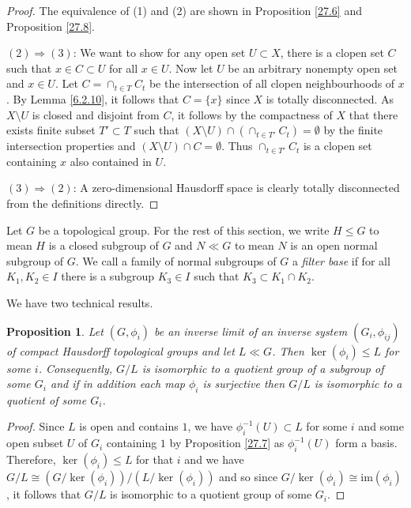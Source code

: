 \documentclass[12pt]{report}
\newtheorem{proposition}[theorem]{Proposition}
{\theoremstyle{remark}\newtheorem*{remark}{Remark}}
\theoremstyle{definition}
\newcommand{\im}{\text{im}}
\begin{document}
\begin{proof}
	The equivalence of (1) and (2) are shown in Proposition \ref{27.6}  and Proposition \ref{27.8}.

	$(2)\Longrightarrow (3)$: We want to show for any open set $U\subset X$, there is a clopen set $C$ such that $x\in C\subset U$ for all $x\in U$. Now let $U$ be an arbitrary nonempty open set and $x\in U$. Let $C=\cap_{t\in T}C_t$ be the intersection of all clopen neighbourhoods of $x$. By Lemma \ref{6.2.10}, it follows that $C=\{x\}$ since $X$ is totally disconnected. As $X\setminus U$ is closed and disjoint from $C$, it follows by the compactness of $X$ that there exists finite subset $T'\subset T$ such that $(X\setminus U)\cap (\cap_{t\in T'}C_t)=\emptyset$ by the finite intersection properties and $(X\setminus U)\cap C=\emptyset$. Thus $\cap_{t\in T'}C_t$ is a clopen set containing $x$ also contained in $U$.


	$(3)\Longrightarrow (2)$: A zero-dimensional Hausdorff space is clearly totally disconnected from the definitions directly.
\end{proof}

Let $G$ be a topological group. For the rest of this section, we write $H\leq G$ to mean $H$ is a closed subgroup of $G$ and $N\ll G$ to mean $N$ is an open normal subgroup of $G$. We call a family of normal subgroups of $G$ a \emph{filter base} if for all $K_1, K_2\in I$ there is a subgroup $K_3\in I$ such that $K_3\subset K_1\cap K_2$.

We have two technical results.

\begin{proposition}
	Let $(G,\phi_i)$ be an inverse limit of an inverse system $(G_i,\phi_{ij})$ of compact Hausdorff topological groups and let $L\ll G$. Then $\ker(\phi_i)\leq L$ for some $i$. Consequently, $G/L$ is isomorphic to a quotient group of a subgroup of some $G_i$ and if in addition each map $\phi_i$ is surjective then $G/L$ is isomorphic to a quotient of some $G_i$.
\end{proposition}

\begin{proof}
	Since $L$ is open and contains $1$, we have $\phi_i^{-1}(U)\subset L$ for some $i$ and some open subset $U$ of $G_i$ containing $1$ by Proposition \ref{27.7} as $\phi_i^{-1}(U)$ form a basis. Therefore, $\ker(\phi_i)\leq L$ for that $i$ and we have $G/L\cong (G/\ker(\phi_i))/(L/\ker(\phi_i))$ and so since $G/\ker(\phi_i) \cong \im(\phi_i)$, it follows that $G/L$ is isomorphic to a quotient group of some $G_i$.
\end{proof}
\end{document}
